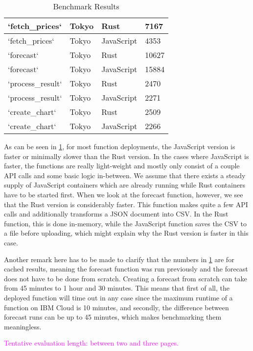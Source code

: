 \begin{table}[h]
\begin{tabular}{|l|l|l|l|}
    `fetch\_prices`   & Tokyo     & Rust       & 7167       \\ \hline
    `fetch\_prices`   & Tokyo     & JavaScript & 4353       \\ \hline
    `forecast`        & Tokyo     & Rust       & 10627      \\ \hline
    `forecast`        & Tokyo     & JavaScript & 15884      \\ \hline
    `process\_result` & Tokyo     & Rust       & 2470       \\ \hline
    `process\_result` & Tokyo     & JavaScript & 2271       \\ \hline
    `create\_chart`   & Tokyo     & Rust       & 2509       \\ \hline
    `create\_chart`   & Tokyo     & JavaScript & 2266       \\ \hline
  \end{tabular}
  \caption{Benchmark Results}
  \label{tab:benchmark}
\end{table}

As can be seen in \cref{tab:benchmark}, for most function deployments,
the JavaScript version is faster or minimally slower than the Rust version.
In the cases where JavaScript is faster, the functions are really light-weight and
mostly only consist of a couple API calls and some basic logic in-between. We assume
that there exists a steady supply of JavaScript containers which are already
running while Rust containers have to be started first. When we look at the forecast
function, however, we see that the Rust version is considerably faster. This function
makes quite a few API calls and additionally transforms a JSON document into CSV. In
the Rust function, this is done in-memory, while the JavaScript function
saves the CSV to a file before uploading, which might explain why the Rust version
is faster in this case.

Another remark here has to be made to clarify that the numbers in \cref{tab:benchmark}
are for cached results, meaning the forecast function was run previously
and the forecast does not have to be done from scratch. Creating a forecast from
scratch can take from 45 minutes to 1 hour and 30 minutes. This means that first of all,
the deployed function will time out in any case since the maximum runtime of a function
on IBM Cloud is 10 minutes, and secondly, the difference between forecast runs can be up
to 45 minutes, which makes benchmarking them meaningless.

\textcolor{magenta}{Tentative evaluation length: between two and three pages.}

